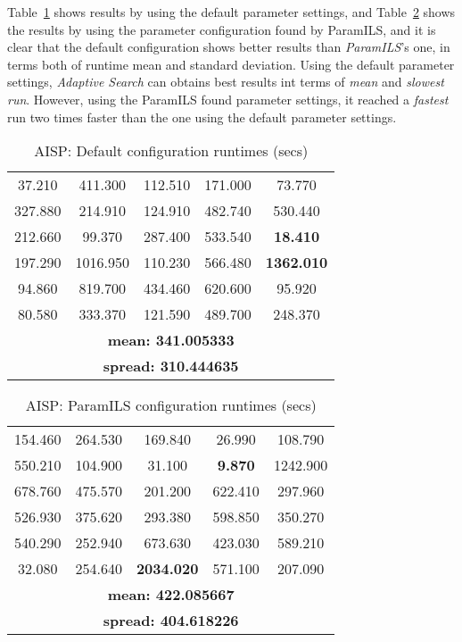 Table~\ref{table:testaibad} shows results by using the default parameter settings, and Table~\ref{table:testaigood} shows the results by using the parameter configuration found by {\sc ParamILS}, and it is clear that the default configuration shows better results than {\it ParamILS}'s one, in terms both of runtime mean and standard deviation. Using the default parameter settings, {\it Adaptive Search} can obtains best results int terms of {\it mean} and {\it slowest run}. However, using the {\sc ParamILS} found parameter settings, it reached a {\it fastest} run two times faster than the one using the default parameter settings. 

\begin{table}[h]
\centering
\renewcommand{\arraystretch}{1.2}
\begin{tabular}{|ccccc|}
	\hline
	37.210 & 411.300 & 112.510 & 171.000 & 73.770 \\ 
	327.880 & 214.910 & 124.910 & 482.740 & 530.440 \\  
	\hline 
	212.660 & 99.370 & 287.400 & 533.540 & \textcolor{naranja}{\bf 18.410} \\ 
	197.290 & 1016.950 & 110.230 & 566.480 & \textcolor{intenso}{\bf 1362.010} \\  
	\hline 
	94.860 & 819.700 & 434.460 & 620.600 & 95.920 \\ 
	80.580 & 333.370 & 121.590 & 489.700 & 248.370 \\  
	\hline 
	\multicolumn{5}{|c|}{\bf mean: 341.005333}\\
	\multicolumn{5}{|c|}{\bf spread: 310.444635}\\
	\hline
\end{tabular}
\caption{AISP: Default configuration runtimes (secs)}\label{table:testaibad}
\end{table}
	
\begin{table}[h]
\centering
\renewcommand{\arraystretch}{1.2}
\begin{tabular}{|ccccc|}
	\hline
	154.460 & 264.530 & 169.840 & 26.990 & 108.790 \\ 
	550.210 & 104.900 & 31.100 & \textcolor{naranja}{\bf 9.870} & 1242.900 \\  
	\hline 
	678.760 & 475.570 & 201.200 & 622.410 & 297.960 \\ 
	526.930 & 375.620 & 293.380 & 598.850 & 350.270 \\  
	\hline 
	540.290 & 252.940 & 673.630 & 423.030 & 589.210 \\ 
	32.080 & 254.640 & \textcolor{intenso}{\bf 2034.020} & 571.100 & 207.090 \\  
	\hline 
	\multicolumn{5}{|c|}{\bf mean: 422.085667}\\
	\multicolumn{5}{|c|}{\bf spread: 404.618226}\\
	\hline
\end{tabular}
\caption{AISP: {\sc ParamILS} configuration runtimes (secs)}\label{table:testaigood}
\end{table} 

